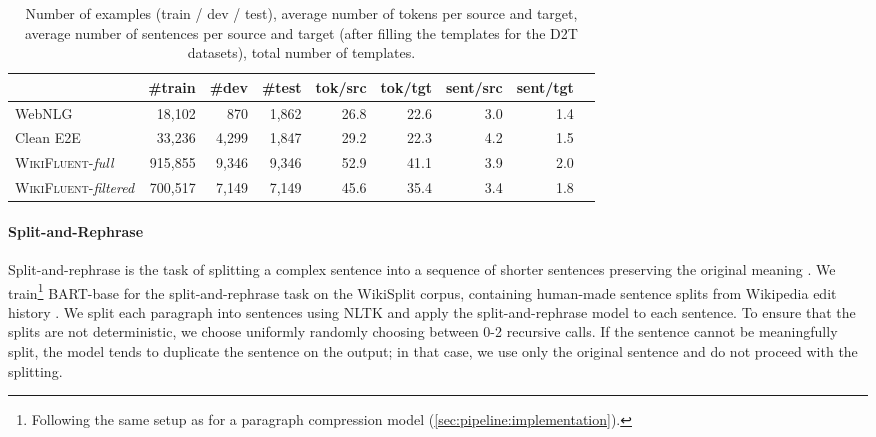 \begin{table}[t]
    \centering
    \footnotesize
    \begin{tabular}{l rrrrrrrr}\toprule
                                              & \bf  \#train & \bf \#dev & \bf \#test & \bf tok/src & \bf tok/tgt & \bf sent/src & \bf sent/tgt \\  \midrule
        WebNLG                                & 18,102       & 870       & 1,862      & 26.8        & 22.6        & 3.0          & 1.4          \\
        Clean E2E                             & 33,236       & 4,299     & 1,847      & 29.2        & 22.3        & 4.2          & 1.5          \\ \midrule
        \textsc{WikiFluent}-\textit{full}     & 915,855      & 9,346     & 9,346      & 52.9        & 41.1        & 3.9          & 2.0          \\
        \textsc{WikiFluent}-\textit{filtered} & 700,517      & 7,149     & 7,149      & 45.6        & 35.4        & 3.4          & 1.8          \\ \bottomrule
    \end{tabular}
    \caption[Statistics of \textsc{WikiFluent} and data-to-text datasets.]{Number of examples (train / dev / test), average number of tokens per source and target, average number of sentences per source and target (after filling the templates for the D2T datasets), total number of templates.}
    \label{tab:stats}
\end{table}

\paragraph{Split-and-Rephrase} Split-and-rephrase is the task of splitting a complex sentence into a sequence of shorter sentences preserving the original meaning \citep{narayan-etal-2017-split}. We train\footnote{Following the same setup as for a paragraph compression model (\autoref{sec:pipeline:implementation}).} BART-base \cite{lewisBARTDenoisingSequencetoSequence2019} for the split-and-rephrase task on the WikiSplit corpus, containing human-made sentence splits from Wikipedia edit history \cite{botha-etal-2018-learning}.  We split each paragraph into sentences using NLTK \cite{bird2006nltk} and apply the split-and-rephrase model to each sentence. To ensure that the splits are not deterministic, we choose uniformly randomly choosing between 0-2 recursive calls. If the sentence cannot be meaningfully split, the model tends to duplicate the sentence on the output; in that case, we use only the original sentence and do not proceed with the splitting.


